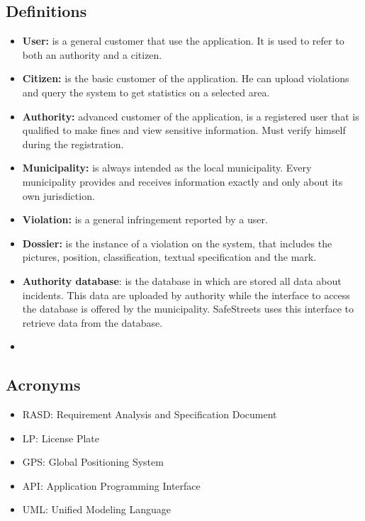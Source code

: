 \documentclass[../RASD.tex]{subfiles}
\begin{document}
    \subsection{Definitions}\label{subsec:definitions}
    \begin{itemize}
        \item \textbf{User:} is a general customer that use the application.
        It is used to refer to both an authority and a citizen.
        \item \textbf{Citizen:} is the basic customer of the application.
        He can upload violations and query the system to get statistics on a selected area.
        \item \textbf{Authority:} advanced customer of the application, is a registered user that is qualified to make fines and view sensitive information.
        Must verify himself during the registration.
        \item \textbf{Municipality:} is always intended as the local municipality.
        Every municipality provides and receives information exactly and only about its own jurisdiction.
        \item \textbf{Violation:} is a general infringement reported by a user.
        \item  \textbf{Dossier:} is the instance of a violation on the system, that includes the pictures, position, classification, textual specification and the mark.
        \item \textbf{Authority database}: is the database in which are stored all data about incidents.
        This data are uploaded by authority while the interface to access the database is offered by the municipality.
        SafeStreets uses this interface to retrieve data from the database.
        \item
    \end{itemize}

    \subsection{Acronyms}\label{subsec:acronyms}
    \begin{itemize}
        \item RASD: Requirement Analysis and Specification Document
        \item LP: License Plate
        \item GPS: Global Positioning System
        \item API: Application Programming Interface
        \item UML: Unified Modeling Language
    \end{itemize}
\end{document}
